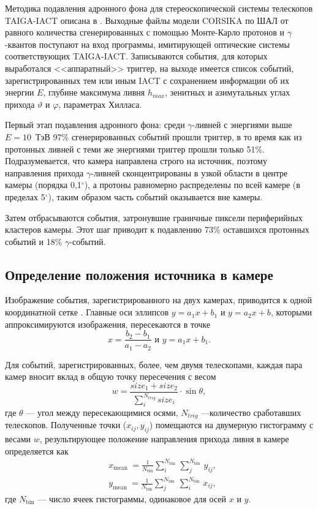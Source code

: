 \documentclass[magd,floatypics,numeref]{msudipl} %
\begin{document}
Методика подавления адронного фона для стереоскопической системы телескопов TAIGA-IACT описана в \cite{Grinyuk:20210M}. Выходные файлы модели CORSIKA по ШАЛ от равного количества сгенерированных с помощью Монте-Карло протонов и $\gamma$-квантов поступают на вход программы, имитирующей оптические системы соответствующих TAIGA-IACT. Записываются события, для которых выработался <<аппаратный>>  триггер, на выходе имеется список событий, зарегистрированных тем или иным IACT с сохранением информации об их энергии $E$, глубине максимума ливня $h_{max}$, зенитных и азимутальных углах прихода $\vartheta$ и $\varphi$, параметрах Хилласа. 

Первый этап подавления  адронного фона: среди $\gamma$-ливней с энергиями выше $E=10$~ТэВ 97\% сгенерированных событий прошли триггер, в то время как из протонных ливней с теми же энергиями триггер прошли только 51\%. Подразумевается, что камера направлена строго на источник, поэтому направления прихода $\gamma$-ливней сконцентрированы в узкой области в центре камеры (порядка 0{,}1$^{\circ}$), а протоны равномерно распределены по всей камере (в пределах 5$^{\circ}$), таким образом часть событий оказывается вне камеры.

Затем отбрасываются события, затронувшие граничные пиксели периферийных кластеров камеры. Этот шаг приводит к подавлению 73\% оставшихся протонных событий и 18\% $\gamma$-событий. 

\subsection{Определение положения источника в камере}
Изображение события, зарегистрированного на двух камерах, приводится к одной координатной сетке \cite{HOFMANN1999135}. Главные оси эллипсов $y = a_1 x + b_1$ и $y = a_2 x + b$, которыми аппроксимируются изображения, пересекаются в точке
\begin{equation}
x=\frac{b_{2}-b_{1}}{a_{1}-a_{2}} \text { и } y=a_{1} x+b_{1}.
\end{equation}

Для событий, зарегистрированных, более, чем двумя телескопами, каждая пара камер вносит вклад в общую точку пересечения с весом
\begin{equation}
w = \frac{size_{1}+size_{2}}{\sum_{i}^{N_{t r i g}} size_{i}} \cdot \sin \theta,
\end{equation}
где $\theta$ --- угол между пересекающимися осями, $N_{trig}$ ---количество сработавших телескопов. Полученные точки ($x_{ij}, y_{ij}$) помещаются на двумерную гистограмму с весами $w$, результирующее положение направления прихода ливня в камере определяется как 
\begin{align}
&x_{\text {mean }}=\frac{1}{N_{\text {bin}}} \sum_{i}^{N_{\text {bin }}} \sum_{j}^{N_{\text {bin }}} y_{i j}, \\
&y_{\text {mean }}=\frac{1}{N_{\text {bin}}} \sum_{j}^{N_{\text {bin }}} \sum_{i}^{N_{\text {bin }}} x_{i j},
\end{align}
где $N_{\text{bin}}$ --- число ячеек гистограммы, одинаковое для осей $x$ и $y$.
\end{document}
